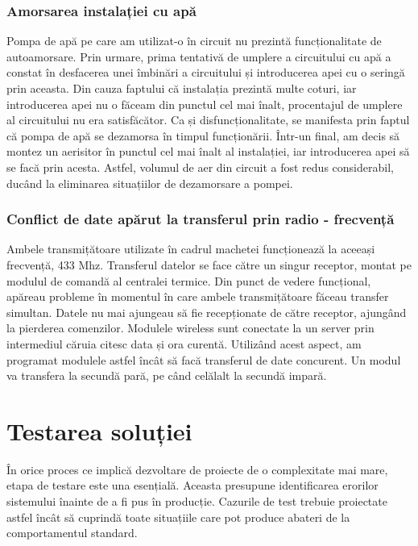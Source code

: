 \subsubsection{Amorsarea instalației cu apă}

	Pompa de apă pe care am utilizat-o în circuit nu prezintă funcționalitate de autoamorsare. Prin urmare, prima tentativă de umplere a circuitului cu apă a constat în desfacerea unei îmbinări a circuitului și introducerea apei cu o seringă prin aceasta. Din cauza faptului că instalația prezintă multe coturi, iar introducerea apei nu o făceam din punctul cel mai înalt, procentajul de umplere al circuitului nu era satisfăcător. Ca și disfuncționalitate, se manifesta prin faptul că pompa de apă se dezamorsa în timpul funcționării. Într-un final, am decis să montez un aerisitor în punctul cel mai înalt al instalației, iar introducerea apei să se facă prin acesta. Astfel, volumul de aer din circuit a fost redus considerabil, ducând la eliminarea situațiilor de dezamorsare a pompei.

\subsubsection{Conflict de date apărut la transferul prin radio - frecvență}

	Ambele transmițătoare utilizate în cadrul machetei funcționează la aceeași frecvență, 433 Mhz. Transferul datelor se face către un singur receptor, montat pe modulul de comandă al centralei termice. Din punct de vedere funcțional, apăreau probleme în momentul în care ambele transmițătoare făceau transfer simultan. Datele nu mai ajungeau să fie recepționate de către receptor, ajungând la pierderea comenzilor. Modulele wireless sunt conectate la un server prin intermediul căruia citesc data și ora curentă. Utilizând acest aspect, am programat modulele astfel încât să facă transferul de date concurent. Un modul va transfera la secundă pară, pe când celălalt la secundă impară. 

\section{Testarea soluției}

	În orice proces ce implică dezvoltare de proiecte de o complexitate mai mare, etapa de testare este una esențială. Aceasta presupune identificarea erorilor sistemului înainte de a fi pus în producție. Cazurile de test trebuie proiectate astfel încât să cuprindă toate situațiile care pot produce abateri de la comportamentul standard. 

